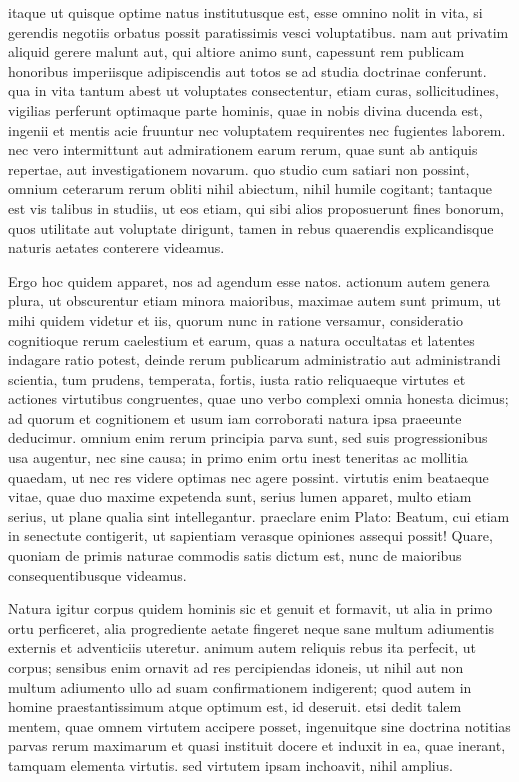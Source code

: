  itaque ut quisque optime natus institutusque est, esse omnino nolit in vita, si gerendis negotiis orbatus possit paratissimis vesci voluptatibus. nam aut privatim aliquid gerere malunt aut, qui altiore animo sunt, capessunt rem publicam honoribus imperiisque adipiscendis aut totos se ad studia doctrinae conferunt. qua in vita tantum abest ut voluptates consectentur, etiam curas, sollicitudines, vigilias perferunt optimaque parte hominis, quae in nobis divina ducenda est, ingenii et mentis acie fruuntur nec voluptatem requirentes nec fugientes laborem. nec vero intermittunt aut admirationem earum rerum, quae sunt ab antiquis repertae, aut investigationem novarum. quo studio cum satiari non possint, omnium ceterarum rerum obliti nihil abiectum, nihil humile cogitant; tantaque est vis talibus in studiis, ut eos etiam, qui sibi alios proposuerunt fines bonorum, quos utilitate aut voluptate dirigunt, tamen in rebus quaerendis explicandisque naturis aetates conterere videamus.

 Ergo hoc quidem apparet, nos ad agendum esse natos. actionum autem genera plura, ut obscurentur etiam minora maioribus, maximae autem sunt primum, ut mihi quidem videtur et iis, quorum nunc in ratione versamur, consideratio cognitioque rerum caelestium et earum, quas a natura occultatas et latentes indagare ratio potest, deinde rerum publicarum administratio aut administrandi scientia, tum prudens, temperata, fortis, iusta ratio reliquaeque virtutes et actiones virtutibus congruentes, quae uno verbo complexi omnia honesta dicimus; ad quorum et cognitionem et usum iam corroborati natura ipsa praeeunte deducimur. omnium enim rerum principia parva sunt, sed suis progressionibus usa augentur, nec sine causa; in primo enim ortu inest teneritas ac mollitia quaedam, ut nec res videre optimas nec agere possint. virtutis enim beataeque vitae, quae duo maxime expetenda sunt, serius lumen apparet, multo etiam serius, ut plane qualia sint intellegantur. praeclare enim Plato: Beatum, cui etiam in senectute contigerit, ut sapientiam verasque opiniones assequi possit! Quare, quoniam de primis naturae commodis satis dictum est, nunc de maioribus consequentibusque videamus.

 Natura igitur corpus quidem hominis sic et genuit et formavit, ut alia in primo ortu perficeret, alia progrediente aetate fingeret neque sane multum adiumentis externis et adventiciis uteretur. animum autem reliquis rebus ita perfecit, ut corpus; sensibus enim ornavit ad res percipiendas idoneis, ut nihil aut non multum adiumento ullo ad suam confirmationem indigerent; quod autem in homine praestantissimum atque optimum est, id deseruit. etsi dedit talem mentem, quae omnem virtutem accipere posset, ingenuitque sine doctrina notitias parvas rerum maximarum et quasi instituit docere et induxit in ea, quae inerant, tamquam elementa virtutis. sed virtutem ipsam inchoavit, nihil amplius.

